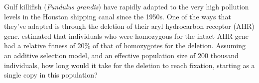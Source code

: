 \begin{question}{} 
Gulf killifish ({\it Fundulus grandis}) have rapidly adapted to the
very high pollution levels in the Houston shipping canal since the
1950s. One of the ways that they've adapted is through the deletion of
their aryl hydrocarbon receptor (AHR)
gene. \citet{oziolor2019adaptive} estimated that individuals who were
homozygous for the intact AHR gene had a relative fitness of 20\% of
that of homozygotes for the deletion. Assuming an additive selection
model, and an effective population size of 200 thousand individuals, how long would it take for the deletion to reach fixation, starting as a single copy in this population?
\end{question}


